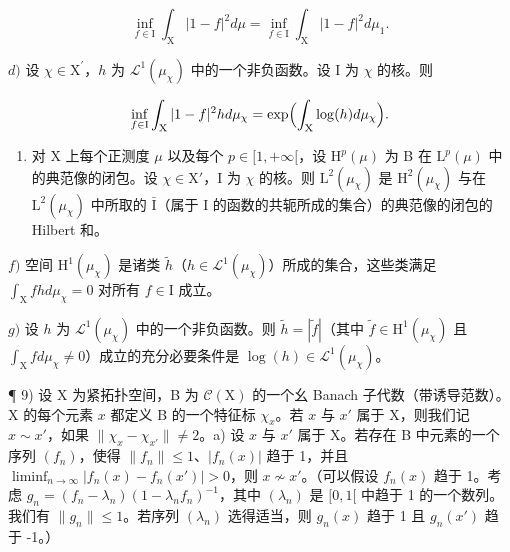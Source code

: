 \[
\inf _ {f \in \mathrm{I}} \int_ {\mathrm{X}} | 1 - f | ^ {2} d \mu = \inf _ {f \in \mathrm{I}} \int_ {\mathrm{X}} | 1 - f | ^ {2} d \mu_ {1}.
\]

\(d)\) 设 \(\chi\in\mathrm{X}^{\prime}\)，\(h\) 为 \(\mathcal{L}^{1}(\mu_{\chi})\) 中的一个非负函数。设 I 为 \(\chi\) 的核。则

\[
\inf _ {f \in \mathrm{I}} \int_ {\mathrm{X}} | 1 - f | ^ {2} h d \mu_ {\chi} = \exp \Bigl (\int_ {\mathrm{X}} \log (h) d \mu_ {\chi} \Bigr).
\]

\begin{enumerate}
\def\labelenumi{\alph{enumi})}
\setcounter{enumi}{4}
\tightlist
\item
  对 X 上每个正测度 \(\mu\) 以及每个 \(p \in [1, +\infty[\)，设 \(\mathrm{H}^p(\mu)\) 为 B 在 \(\mathrm{L}^p(\mu)\) 中的典范像的闭包。设 \(\chi \in \mathrm{X}'\)，I 为 \(\chi\) 的核。则 \(\mathrm{L}^2(\mu_\chi)\) 是 \(\mathrm{H}^2(\mu_\chi)\) 与在 \(\mathrm{L}^2(\mu_\chi)\) 中所取的 \(\bar{\mathrm{I}}\)（属于 I 的函数的共轭所成的集合）的典范像的闭包的 Hilbert 和。
\end{enumerate}

\(f)\) 空间 \(\mathrm{H}^1 (\mu_\chi)\) 是诸类 \(\widetilde{h}\)（\(h\in \mathcal{L}^1 (\mu_\chi)\)）所成的集合，这些类满足 \(\int_{\mathrm{X}}fh  d\mu_{\chi} = 0\) 对所有 \(f\in \mathrm{I}\) 成立。

\(g)\) 设 \(h\) 为 \(\mathcal{L}^1 (\mu_\chi)\) 中的一个非负函数。则 \(\widetilde{h} = |\widetilde{f}|\)（其中 \(\widetilde{f}\in \mathrm{H}^1 (\mu_\chi)\) 且 \(\int_{\mathrm{X}}f  d\mu_{\chi}\neq 0\)）成立的充分必要条件是 \(\log (h)\in \mathcal{L}^1 (\mu_\chi)\)。

¶ 9) 设 X 为紧拓扑空间，B 为 \(\mathcal{C}(\mathrm{X})\) 的一个幺 Banach 子代数（带诱导范数）。X 的每个元素 \(x\) 都定义 B 的一个特征标 \(\chi_x\)。若 \(x\) 与 \(x'\) 属于 X，则我们记 \(x \sim x'\)，如果 \(\| \chi_x - \chi_{x'} \| \neq 2\)。a) 设 \(x\) 与 \(x'\) 属于 X。若存在 B 中元素的一个序列 \((f_n)\)，使得 \(\| f_n \| \leqslant 1\)、\(|f_n(x)|\) 趋于 1，并且 \(\liminf_{n \to \infty} |f_n(x) - f_n(x')| > 0\)，则 \(x\not\sim x'\)。（可以假设 \(f_n(x)\) 趋于 1。考虑 \(g_n = (f_n - \lambda_n)(1 - \lambda_n f_n)^{-1}\)，其中 \((\lambda_n)\) 是 \([0,1[\) 中趋于 1 的一个数列。我们有 \(\| g_n \| \leqslant 1\)。若序列 \((\lambda_n)\) 选得适当，则 \(g_n(x)\) 趋于 1 且 \(g_n(x')\) 趋于 -1。）

